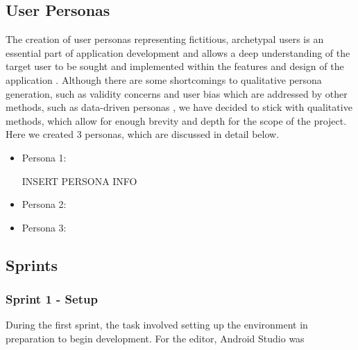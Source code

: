 \documentclass[12pt]{article}
\begin{document}
	\subsection{User Personas}
	The creation of user personas representing fictitious, archetypal users is an essential part of application development \cite{Grudin and Pruitt, 2002} and allows a deep understanding of the target user to be sought and implemented within the features and design of the application \cite{Long, 2009}. Although there are some shortcomings to qualitative persona generation, such as validity concerns and user bias \cite{Chapman and Milham, 2007} which are addressed by other methods, such as data-driven personas \cite{Mcginn and Kotamraju, 2008}, we have decided to stick with qualitative methods, which allow for enough brevity and depth for the scope of the project. Here we created 3 personas, which are discussed in detail below.
	\begin{itemize}
		\item Persona 1: 
		
		INSERT PERSONA INFO
		\item Persona 2:
		\item Persona 3:
	\end{itemize}


	\subsection{Sprints}
	\subsubsection{Sprint 1 - Setup}
	During the first sprint, the task involved setting up the environment in preparation to begin development. For the editor, Android Studio was 

	
\end{document}
